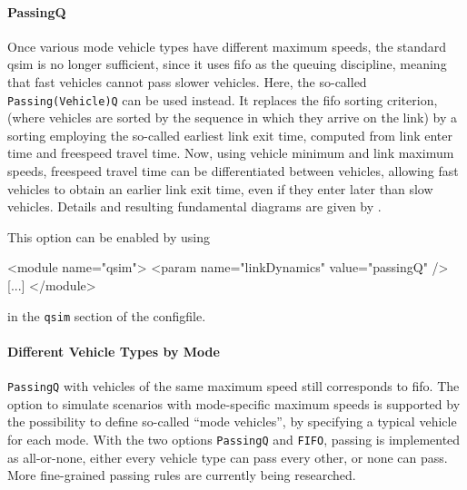 \paragraph{PassingQ} 
Once various mode vehicle types have different maximum speeds, the standard \gls{qsim} is no longer sufficient, since it uses \gls{fifo} as the queuing discipline, meaning that fast vehicles cannot pass slower vehicles. Here, the so-called \lstinline|Passing(Vehicle)Q| can be used instead.  It replaces the \gls{fifo} sorting criterion, (where vehicles are sorted by the sequence in which they arrive on the link) by a sorting employing the so-called earliest link exit time, computed from link enter time and freespeed travel time.  Now, using vehicle minimum and  link maximum speeds, freespeed travel time can be differentiated between vehicles, allowing fast vehicles to obtain an earlier link exit time, even if they enter later than slow vehicles.  Details and resulting fundamental diagrams are given by \citet{AgarwalEtcMixedTraffic}.

This option can be enabled by using
\begin{xml}
<module name="qsim">
   <param name="linkDynamics" value="passingQ" />
   [...]
</module>
\end{xml}
in the \lstinline{qsim} section of the \gls{configfile}.

\paragraph{Different Vehicle Types by Mode}
\lstinline|PassingQ| with vehicles of the same maximum speed still corresponds to \gls{fifo}. 
The option to simulate scenarios with 
mode-specific maximum speeds is supported by the possibility to define so-called ``mode vehicles'', \ie by specifying a typical vehicle for each mode.
%
With the two options \lstinline{PassingQ} and \lstinline{FIFO}, passing is implemented as all-or-none, \ie either every vehicle type can pass every other, or none can pass. More fine-grained passing rules are currently being researched.
%  
%
%
%

